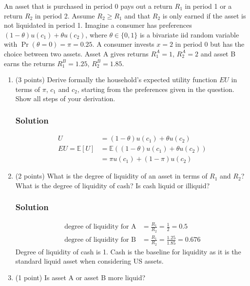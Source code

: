 \documentclass[12pt]{article}
\begin{document}
An asset that is purchased in period 0 pays out a return $R_1$ in period 1 or a return $R_2$ in period 2. Assume $R_2 \geq R_1$ and that $R_2$ is only earned if the asset is not liquidated in period 1. Imagine a consumer has preferences $(1 - \theta)u(c_1) + \theta u(c_2)$, where $\theta \in \{0, 1\}$ 
is a bivariate iid random variable with $\Pr(\theta = 0) = \pi = 0.25$. A consumer invests $x = 2$ in period 0 but has the choice between two assets. Asset A gives returns $R_{1}^A = 1$, $R_{2}^A = 2$ and asset B earns the returns $R_{1}^B = 1.25$, $R_{2}^B = 1.85$.

\begin{enumerate}[label=(\alph*)]
    \item (3 points) Derive formally the household’s expected utility function $EU$ in terms of $\pi$, $c_1$ and $c_2$, starting from the preferences given in the question. Show all steps of your derivation.

    \subsubsection*{Solution}
    \begin{align*}
    U &= (1 - \theta)u(c_1) + \theta u(c_2)
    \\ EU = \mathbb{E}[U]&= \mathbb{E}\left((1 - \theta)u(c_1) + \theta u(c_2)\right)
    \\      &= \pi u(c_1) + (1-\pi) u(c_2)
    \end{align*}

    \item (2 points) What is the degree of liquidity of an asset in terms of $R_1$ and $R_2$? What is the degree of liquidity of cash? Is cash liquid or illiquid?
    \subsubsection*{Solution}

    \begin{align*}
        \text{degree of liquidity for A} &= \frac{R_1}{R_2} = \frac{1}{2} = 0.5
        \\ \text{degree of liquidity for B} &= \frac{R_1}{R_2} = \frac{1.25}{1.85} = 0.676
    \end{align*}
    Degree of liquidity of cash is 1. Cash is the baseline for liquidity as it is the standard liquid asset when considering US assets. 
    

    \item (1 point) Is asset A or asset B more liquid?

\end{enumerate}
\end{document}
